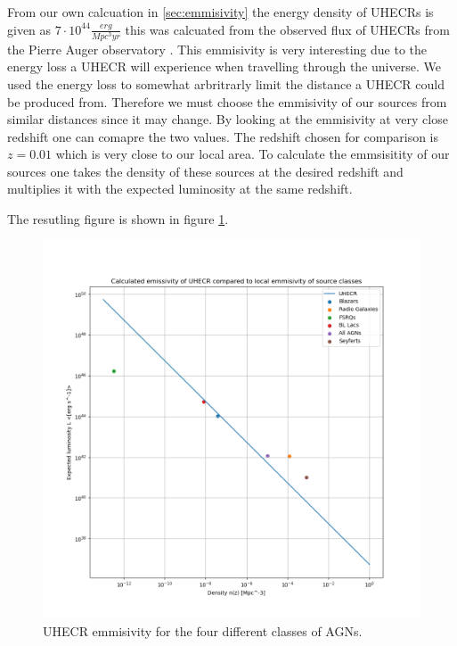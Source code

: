\documentclass{article}
\begin{document}
From our own calcuation in \ref{sec:emmisivity} the energy density of UHECRs is given as $7 \cdot 10^{44}\frac{erg}{Mpc^3yr}$ this was calcuated from the observed flux of UHECRs from the Pierre Auger observatory \cite{thepierreaugercollaboration2017pierre}.
This emmisivity is very interesting due to the energy loss a UHECR will experience when travelling through the universe. We used the energy loss to somewhat arbritrarly limit the distance a UHECR could be produced from.
Therefore we must choose the emmisivity of our sources from similar distances since it may change. By looking at the emmisivity at very close redshift one can comapre the two values. The redshift chosen for comparison is $z=0.01$ which is  very close to our local area. %
To calculate the emmsisitity of our sources one takes the density of these sources at the desired redshift and multiplies it with the expected luminosity at the same redshift.



The resutling figure is shown in figure \ref{fig:UHECR}.

\begin{figure}[H]
    \centering
    \includegraphics[width = \textwidth]{new_plots/L_n_uhecr_calc.png}
    \caption{UHECR emmisivity for the four different classes of AGNs.}
    \label{fig:UHECR}
\end{figure}
\end{document}
